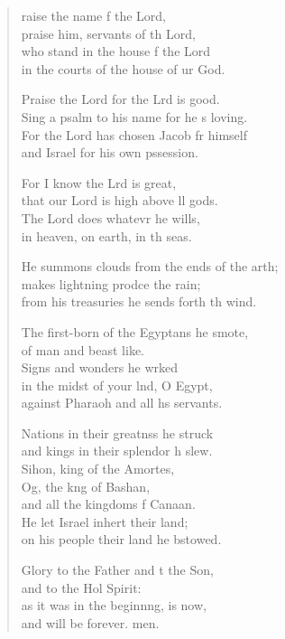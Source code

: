\settowidth{\versewidth}{He summons clouds from the ends of the earth; +}
\begin{verse}%
  \begin{patverse}
raise the name f the Lord,\Med\\
praise him, servants of th Lord,\\
who stand in the house f the Lord\Med\\
in the courts of the house of ur God.

Praise the Lord for the Lrd is good.\Med\\
Sing a psalm to his name for he \pointup{\i}s loving.\\
For the Lord has chosen Jacob fr himself\Med\\
and Israel for his own pssession.

For I know the Lrd is great,\Med\\
that our Lord is high above ll gods.\\
The Lord does whatevr he wills,\Med\\
in heaven, on earth, in th seas.

He summons clouds from the ends of the arth;\Flex\\
makes lightning prodce the rain;\Med\\
from his treasuries he sends forth th wind.

The first-born of the Egypt\pointup{\i}ans he smote,\Med\\
of man and beast like.\\
Signs and wonders he wrked\Flex\\
in the midst of your lnd, O Egypt,\Med\\
against Pharaoh and all h\pointup{\i}s servants.

Nations in their greatnss he struck\Med\\
and kings in their splendor h slew.\\
Sihon, king of the Amor\pointup{\i}tes,\Flex\\
Og, the k\pointup{\i}ng of Bashan,\Med\\
and all the kingdoms f Canaan.\\
He let Israel inher\pointup{\i}t their land;\Med\\
on his people their land he bstowed.

Glory to the Father and t the Son,\Med\\
and to the Hol Spirit:\\
as it was in the beginn\pointup{\i}ng, is now,\Med\\
and will be forever. men.
  \end{patverse}
\end{verse}
